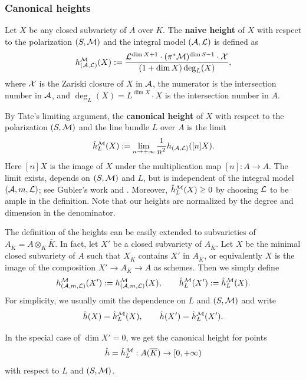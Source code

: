 \documentclass[12pt]{amsart}
\begin{document}
\subsubsection{Canonical heights}

Let $X$ be any closed subvariety of $A$ over $K$.
The {\bf{naive height}} of $X$ with respect to the polarization $(S,{\mathcal M})$
and the integral model $({\mathcal A}, {\mathcal L})$ is defined as 
\begin{equation}
\label{eq:naiveheight}
h_{({\mathcal A},{\mathcal L})}^{{\mathcal M}}(X):=\frac{{\mathcal L}^{\dim X+1}\cdot (\pi^*{\mathcal M})^{\dim S-1}\cdot {\mathcal X}}{(1+\dim X)\deg_L(X)},
\end{equation}
where ${\mathcal X}$ is the Zariski closure of $X$ in ${\mathcal A}$, the numerator is the intersection number in ${\mathcal A}$, and $\deg_L(X)=L^{\dim X}\cdot X$
is the intersection number in $A$.

By Tate's limiting argument, the {\bf{canonical height}} of $X$ with respect to the polarization $(S,{\mathcal M})$
and the line bundle $L$ over $A$ is the limit
\begin{equation}\label{eq:ntlimit}
\hat{h}_L^{{\mathcal M}}(X)
:=\lim_{n\to +\infty} \frac{1}{n^2}h_{({\mathcal A},{\mathcal L})}([n]X).
\end{equation}
Here $[n]X$ is the image of $X$ under the multiplication map $[n]:A\to A$.
The limit exists, depends on $(S,{\mathcal M})$ and $L$, but is independent of the integral model $({\mathcal A}, m, {\mathcal L})$; see Gubler's work \cite[Theorem 3.6]{Gubler2007} and \cite[Theorem 11.18]{Gubler:Pisa03}.
Moreover, $\hat{h}_L^{{\mathcal M}}(X)\geq0$ by choosing ${\mathcal L}$ to be ample in the definition.
Note that our heights are normalized by the degree and dimension in the denominator. 

The definition of the heights can be easily extended to subvarieties of $A_{\overline{K}}=A\otimes_K\overline{K}$. In fact, let $X'$ be a closed subvariety of $A_{\overline{K}}$.
Let $X$ be the minimal closed subvariety of $A$ such that $X_{\overline K}$ contains $X'$ in $A_{\overline{K}}$, or equivalently $X$ is the image of the composition 
$X'\to A_{\overline{K}}\to A$ as schemes. 
Then we simply define
\begin{equation}\label{eq:ntlimit}
h_{({\mathcal A},m,{\mathcal L})}^{{\mathcal M}}(X')
:=h_{({\mathcal A},m,{\mathcal L})}^{{\mathcal M}}(X),\qquad
\hat{h}_L^{{\mathcal M}}(X')
:=\hat{h}_L^{{\mathcal M}}(X).
\end{equation}
For simplicity, we usually omit the dependence on $L$ and $(S,{\mathcal M})$ and write 
$$\hat{h}(X)=\hat{h}_L^{{\mathcal M}}(X),\qquad
\hat{h}(X')=\hat{h}_L^{{\mathcal M}}(X').$$

In the special case of $\dim X'=0$, we get the canonical height  for points 
$$\hat{h}=\hat{h}_L^{{\mathcal M}}:A(\overline{K})\to [0,+\infty)$$ 
with respect to $L$ and $(S,{\mathcal M})$.
\end{document}
